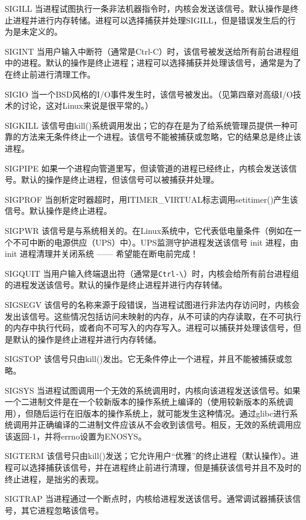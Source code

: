 \begin{eqlist*}
\item[SIGILL] 当进程试图执行一条非法机器指令时，内核会发送该信号。默认操作是终止进程并进行内存转储。进程可以选择捕获并处理SIGILL，但是错误发生后的行为是未定义的。
\item[SIGINT] 当用户输入中断符（通常是Ctrl-C）时，该信号被发送给所有前台进程组中的进程。默认的操作是终止进程；进程可以选择捕获并处理该信号，通常是为了在终止前进行清理工作。
\item[SIGIO] 当一个BSD风格的I/O事件发生时，该信号被发出。（见第四章对高级I/O技术的讨论，这对Linux来说是很平常的。）
\item[SIGKILL] 该信号由kill()系统调用发出；它的存在是为了给系统管理员提供一种可靠的方法来无条件终止一个进程。该信号不能被捕获或忽略，它的结果总是终止该进程。
\item[SIGPIPE] 如果一个进程向管道里写，但读管道的进程已经终止，内核会发送该信号。默认的操作是终止进程，但该信号可以被捕获并处理。
\item[SIGPROF] 当剖析定时器超时，用ITIMER\_VIRTUAL标志调用setitimer()产生该信号。默认操作是终止进程。
\item[SIGPWR] 该信号是与系统相关的。在Linux系统中，它代表低电量条件（例如在一个不可中断的电源供应（UPS）中）。UPS监测守护进程发送该信号 init 进程，由 init 进程清理并关闭系统 —— 希望能在断电前完成！
\item[SIGQUIT] 当用户输入终端退出符（通常是\verb|Ctrl-\|）时，内核会给所有前台进程组的进程发送该信号。默认的操作是终止进程并进行内存转储。
\item[SIGSEGV] 该信号的名称来源于段错误，当进程试图进行非法内存访问时，内核会发出该信号。这些情况包括访问未映射的内存，从不可读的内存读取，在不可执行的内存中执行代码，或者向不可写入的内存写入。进程可以捕获并处理该信号，但是默认的操作是终止进程并进行内存转储。
\item[SIGSTOP] 该信号只由kill()发出。它无条件停止一个进程，并且不能被捕获或忽略。
\item[SIGSYS] 当进程试图调用一个无效的系统调用时，内核向该进程发送该信号。如果一个二进制文件是在一个较新版本的操作系统上编译的（使用较新版本的系统调用），但随后运行在旧版本的操作系统上，就可能发生这种情况。通过glibc进行系统调用并正确编译的二进制文件应该从不会收到该信号。相反，无效的系统调用应该返回-1，并将errno设置为ENOSYS。
\item[SIGTERM] 该信号只由kill()发送；它允许用户“优雅”的终止进程（默认操作）。进程可以选择捕获该信号，并在进程终止前进行清理，但是捕获该信号并且不及时的终止进程，是拙劣的表现。
\item[SIGTRAP] 当进程通过一个断点时，内核给进程发送该信号。通常调试器捕获该信号，其它进程忽略该信号。

\end{eqlist*}
